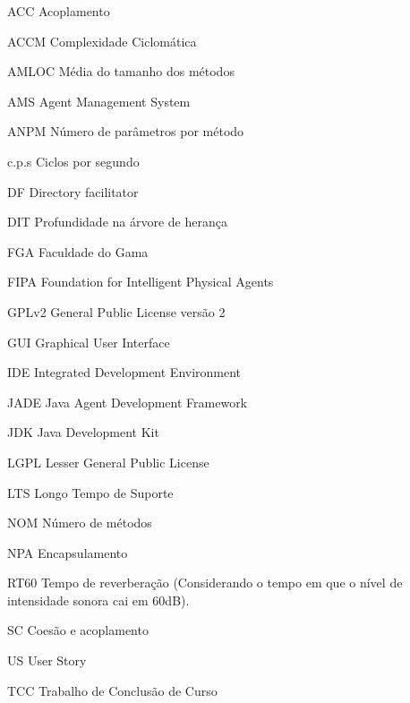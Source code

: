 \begin{siglas}
	\item[ACC]		Acoplamento	
	\item[ACCM] 		Complexidade Ciclomática
	\item[AMLOC]		Média do tamanho dos métodos
	\item[AMS] 		Agent Management System
	\item[ANPM]		Número de parâmetros por método
	\item[c.p.s]		Ciclos por segundo
	\item[DF] 		Directory facilitator
	\item[DIT]		Profundidade na árvore de herança
	\item[FGA] 		Faculdade do Gama	
	\item[FIPA] 		Foundation for Intelligent Physical Agents
	\item[GPLv2]		General Public License versão 2
	\item[GUI] 		Graphical User Interface
	\item[IDE] 		Integrated Development Environment
	\item[JADE] 		Java Agent Development Framework
	\item[JDK] 		Java Development Kit	
	\item[LGPL] 		Lesser General Public License	
	\item[LTS] 		Longo Tempo de Suporte
	\item[NOM]		Número de métodos
	\item[NPA]		Encapsulamento
	\item[RT60]		Tempo de reverberação (Considerando o tempo em que o nível de intensidade sonora cai em 60dB).
	\item[SC]		Coesão e acoplamento
	\item[US]		User Story
	\item[TCC] 		Trabalho de Conclusão de Curso
	
	
	
\end{siglas}
